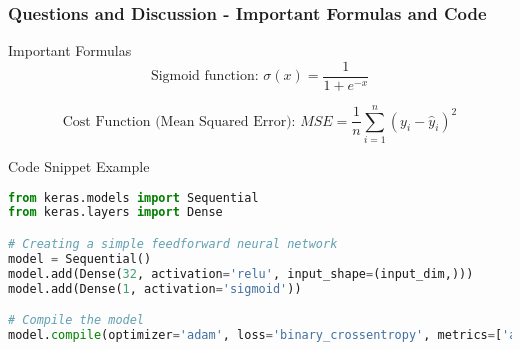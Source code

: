 \documentclass[aspectratio=169]{beamer}
\begin{document}
\begin{frame}[fragile]
  \frametitle{Questions and Discussion - Important Formulas and Code}
  \begin{block}{Important Formulas}
    \begin{equation}
      \text{Sigmoid function: } \sigma(x) = \frac{1}{1 + e^{-x}}
    \end{equation}

    \begin{equation}
      \text{Cost Function (Mean Squared Error): } 
      MSE = \frac{1}{n}\sum_{i=1}^{n} (y_i - \hat{y}_i)^2
    \end{equation}
  \end{block}

  \begin{block}{Code Snippet Example}
    \begin{lstlisting}[language=Python]
from keras.models import Sequential
from keras.layers import Dense

# Creating a simple feedforward neural network
model = Sequential()
model.add(Dense(32, activation='relu', input_shape=(input_dim,)))
model.add(Dense(1, activation='sigmoid'))

# Compile the model
model.compile(optimizer='adam', loss='binary_crossentropy', metrics=['accuracy'])
    \end{lstlisting}
  \end{block}
\end{frame}
\end{document}
